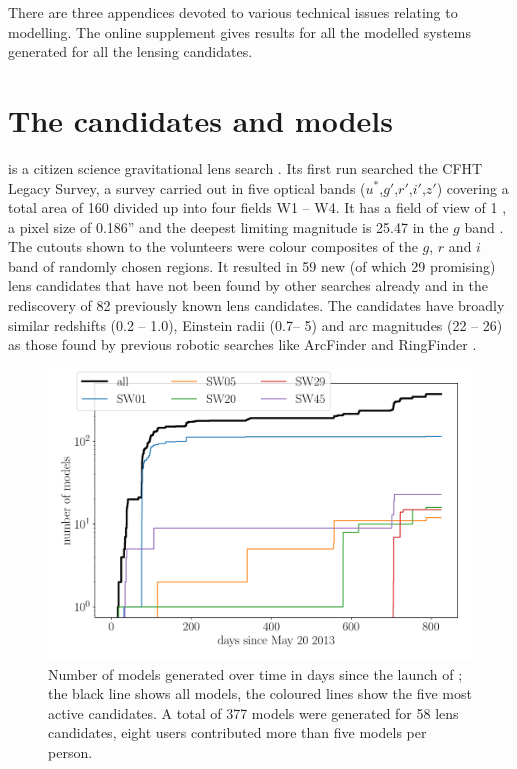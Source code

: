 There are three appendices devoted to various technical issues
relating to modelling.
The online supplement gives results for all the modelled systems generated
for all the lensing candidates.




\section{The candidates and models}
\label{sec:candidates_models}

\SW is a citizen science gravitational lens search \citep{2016MNRAS.455.1171M}.
Its first run searched the CFHT Legacy Survey, a survey carried out in five optical bands ($u^*$,$g'$,$r'$,$i'$,$z'$) covering a total area of 160 \sqdeg divided up into four fields W1 -- W4.
It has a field of view of 1 \sqdeg, a pixel size of 0.186'' and the deepest limiting magnitude is 25.47 in the $g$ band \citep{2012AJ....143...38G}.
The cutouts shown to the volunteers were colour composites of the $g$, $r$ and $i$ band of randomly chosen regions.
It resulted in 59 new (of which 29 promising) lens candidates that have not been found by other searches already and in the rediscovery of 82 previously known lens candidates.
The candidates have broadly similar redshifts (0.2 -- 1.0), Einstein radii (0.7\arcsec -- 5\arcsec) and arc magnitudes (22 -- 26) as those found by previous robotic searches like ArcFinder and RingFinder \citep{2016MNRAS.455.1191M}.

\begin{figure}
  \includegraphics[width=\linewidth]{img/timelapse3}
  \caption{ Number of models generated over time in days since the launch of \SpL; the black line shows all models, the coloured lines show the five most active candidates. A total of 377 models were generated for 58 lens candidates, eight users contributed more than five models per person. }
  \label{fig:time}
\end{figure}


